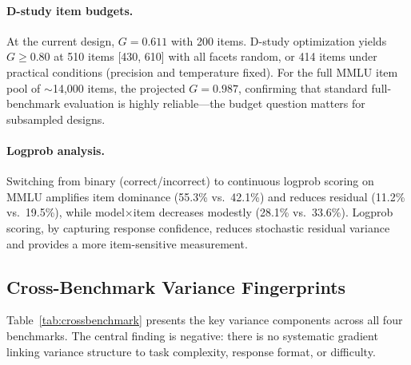 \documentclass[11pt]{article}
\begin{document}
\paragraph{D-study item budgets.}
At the current design, $G = 0.611$ with 200 items.
D-study optimization yields $G \geq 0.80$ at 510 items [430, 610] with all facets random, or 414 items under practical conditions (precision and temperature fixed).
For the full MMLU item pool of $\sim$14{,}000 items, the projected $G = 0.987$, confirming that standard full-benchmark evaluation is highly reliable---the budget question matters for subsampled designs.

\paragraph{Logprob analysis.}
Switching from binary (correct/incorrect) to continuous logprob scoring on MMLU amplifies item dominance (55.3\% vs.\ 42.1\%) and reduces residual (11.2\% vs.\ 19.5\%), while model$\times$item decreases modestly (28.1\% vs.\ 33.6\%).
Logprob scoring, by capturing response confidence, reduces stochastic residual variance and provides a more item-sensitive measurement.

\subsection{Cross-Benchmark Variance Fingerprints}
\label{sec:crossbench}

Table~\ref{tab:crossbenchmark} presents the key variance components across all four benchmarks.
The central finding is negative: there is no systematic gradient linking variance structure to task complexity, response format, or difficulty.
\end{document}
